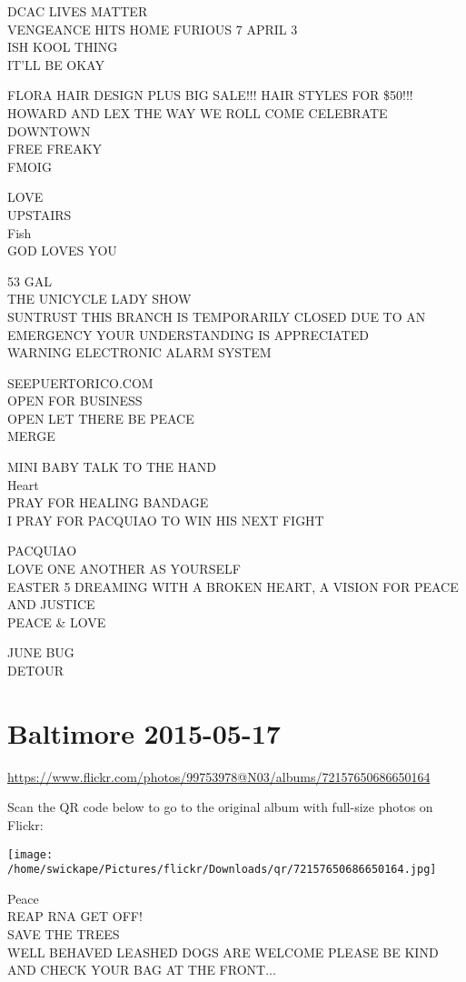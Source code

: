 \documentclass[10pt,letterpaper]{article}
\begin{document}
DCAC LIVES MATTER\\
VENGEANCE HITS HOME FURIOUS 7 APRIL 3\\
ISH KOOL THING\\
IT'LL BE OKAY

FLORA HAIR DESIGN PLUS BIG SALE!!!  HAIR STYLES FOR \$50!!!\\
HOWARD AND LEX THE WAY WE ROLL COME CELEBRATE DOWNTOWN\\
FREE FREAKY\\
FMOIG

LOVE\\
UPSTAIRS\\
Fish\\
GOD LOVES YOU

53 GAL\\
THE UNICYCLE LADY SHOW\\
SUNTRUST THIS BRANCH IS TEMPORARILY CLOSED DUE TO AN EMERGENCY YOUR UNDERSTANDING IS APPRECIATED\\
WARNING ELECTRONIC ALARM SYSTEM

SEEPUERTORICO.COM\\
OPEN FOR BUSINESS\\
OPEN LET THERE BE PEACE\\
MERGE

MINI BABY TALK TO THE HAND\\
Heart\\
PRAY FOR HEALING BANDAGE\\
I PRAY FOR PACQUIAO TO WIN HIS NEXT FIGHT

PACQUIAO\\
LOVE ONE ANOTHER AS YOURSELF\\
EASTER 5 DREAMING WITH A BROKEN HEART, A VISION FOR PEACE AND JUSTICE\\
PEACE \& LOVE

JUNE BUG\\
DETOUR


\section*{Baltimore 2015-05-17}

\url{https://www.flickr.com/photos/99753978@N03/albums/72157650686650164}

Scan the QR code below to go to the original album with full-size photos on Flickr:

\texttt{[image: /home/swickape/Pictures/flickr/Downloads/qr/72157650686650164.jpg]}


Peace\\
REAP RNA GET OFF!\\
SAVE THE TREES\\
WELL BEHAVED LEASHED DOGS ARE WELCOME PLEASE BE KIND AND CHECK YOUR BAG AT THE FRONT...
\end{document}
